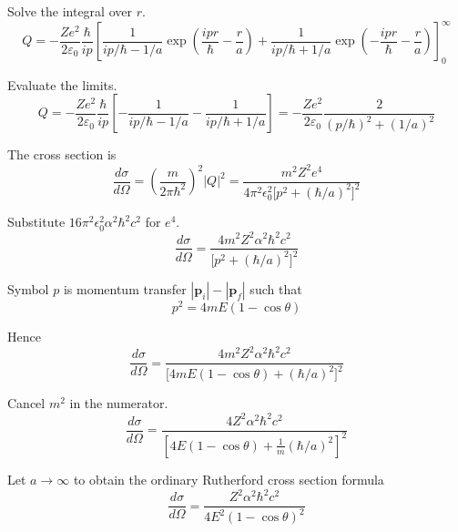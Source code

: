 Solve the integral over $r$.
\begin{equation*}
Q=-\frac{Ze^2}{2\varepsilon_0}
\frac{\hbar}{ip}
\left[
\frac{1}{ip/\hbar-1/a}
\exp\left(\frac{ipr}{\hbar}-\frac{r}{a}\right)
+\frac{1}{ip/\hbar+1/a}
\exp\left(-\frac{ipr}{\hbar}-\frac{r}{a}\right)
\right]_0^\infty
\end{equation*}

Evaluate the limits.
\begin{equation*}
Q=-\frac{Ze^2}{2\varepsilon_0}
\frac{\hbar}{ip}
\left[
-\frac{1}{ip/\hbar-1/a}
-\frac{1}{ip/\hbar+1/a}
\right]
=-\frac{Ze^2}{2\varepsilon_0}\frac{2}{(p/\hbar)^2+(1/a)^2}
\tag{1}
\end{equation*}

The cross section is
\begin{equation*}
\frac{d\sigma}{d\Omega}
=\left(\frac{m}{2\pi\hbar^2}\right)^2|Q|^2
=\frac{m^2Z^2e^4}{4\pi^2\epsilon_0^2\bigl[p^2+(\hbar/a)^2\bigr]^2}
\tag{2}
\end{equation*}

Substitute $16\pi^2\epsilon_0^2\alpha^2\hbar^2c^2$ for $e^4$.
\begin{equation*}
\frac{d\sigma}{d\Omega}
=\frac{4m^2Z^2\alpha^2\hbar^2c^2}{\bigl[p^2+(\hbar/a)^2\bigr]^2}
\end{equation*}

Symbol $p$ is momentum transfer $|\mathbf p_i|-|\mathbf p_f|$ such that
\begin{equation*}
p^2=4mE(1-\cos\theta)
\end{equation*}

Hence
\begin{equation*}
\frac{d\sigma}{d\Omega}
=\frac{4m^2Z^2\alpha^2\hbar^2c^2}{\bigl[4mE(1-\cos\theta)+(\hbar/a)^2\bigr]^2}
\end{equation*}

Cancel $m^2$ in the numerator.
\begin{equation*}
\frac{d\sigma}{d\Omega}
=\frac{4Z^2\alpha^2\hbar^2c^2}{\left[4E(1-\cos\theta)+\frac{1}{m}(\hbar/a)^2\right]^2}
\tag{3}
\end{equation*}

Let $a\rightarrow\infty$ to obtain the ordinary Rutherford cross section formula
\begin{equation*}
\frac{d\sigma}{d\Omega}
=\frac{Z^2\alpha^2\hbar^2c^2}{4E^2(1-\cos\theta)^2}
\end{equation*}


